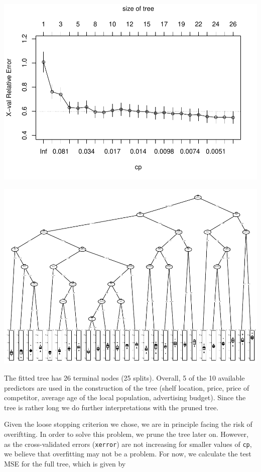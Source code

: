 \documentclass[
]{article}
\begin{document}
\begin{center}\includegraphics{A3_files/figure-latex/unnamed-chunk-5-1} \end{center}

\includegraphics{A3_files/figure-latex/unnamed-chunk-6-1.pdf}

The fitted tree has 26 terminal nodes (25 splits). Overall, 5 of the 10
available predictors are used in the construction of the tree (shelf
location, price, price of competitor, average age of the local
population, advertising budget). Since the tree is rather long we do
further interpretations with the pruned tree.

Given the loose stopping criterion we chose, we are in principle facing
the risk of overiftting. In order to solve this problem, we prune the
tree later on. However, as the cross-validated errors (\texttt{xerror})
are not increasing for smaller values of \texttt{cp}, we believe that
overfitting may not be a problem. For now, we calculate the test MSE for
the full tree, which is given by
\end{document}
